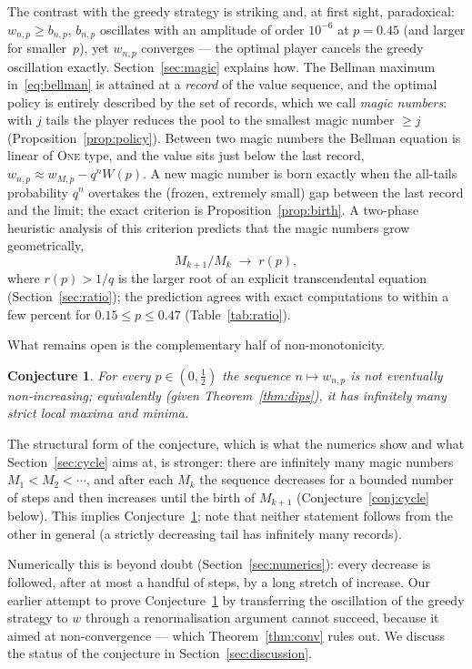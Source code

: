 \documentclass[11pt]{article}
\newtheorem{conjecture}[theorem]{Conjecture}
\theoremstyle{definition}
\newcommand{\One}{\textsc{One}}
\begin{document}
The contrast with the greedy strategy is striking and, at first
sight, paradoxical: $w_{n,p}\ge b_{n,p}$, $b_{n,p}$ oscillates with an
amplitude of order $10^{-6}$ at $p=0.45$ (and larger for smaller~$p$),
yet $w_{n,p}$ converges --- the optimal player cancels the greedy
oscillation exactly.  Section~\ref{sec:magic} explains how.  The
Bellman maximum in~\eqref{eq:bellman} is attained at a \emph{record}
of the value sequence, and the optimal policy is entirely described by
the set of records, which we call \emph{magic numbers}: with $j$ tails
the player reduces the pool to the smallest magic number $\ge j$
(Proposition~\ref{prop:policy}).  Between two magic numbers the
Bellman equation is linear of \One{} type, and the value sits just
below the last record, $w_{n,p}\approx w_{M,p}-q^{n}W(p)$.  A new
magic number is born exactly when the all-tails probability $q^{n}$
overtakes the (frozen, extremely small) gap between the last record
and the limit; the exact criterion is Proposition~\ref{prop:birth}.
A two-phase heuristic analysis of this criterion predicts that the
magic numbers grow geometrically,
\[
  M_{k+1}/M_k\;\longrightarrow\;r(p),
\]
where $r(p)>1/q$ is the larger root of an explicit transcendental
equation (Section~\ref{sec:ratio}); the prediction agrees with exact
computations to within a few percent for $0.15\le p\le0.47$
(Table~\ref{tab:ratio}).

What remains open is the complementary half of non-monotonicity.

\begin{conjecture}\label{conj:B}
  For every $p\in(0,\tfrac12)$ the sequence $n\mapsto w_{n,p}$ is not
  eventually non-increasing; equivalently (given
  Theorem~\ref{thm:dips}), it has infinitely many strict local maxima
  and minima.
\end{conjecture}

The structural form of the conjecture, which is what the numerics show
and what Section~\ref{sec:cycle} aims at, is stronger: there are
infinitely many magic numbers $M_1<M_2<\cdots$, and after each $M_k$
the sequence decreases for a bounded number of steps and then
increases until the birth of $M_{k+1}$ (Conjecture~\ref{conj:cycle}
below).  This implies Conjecture~\ref{conj:B}; note that neither
statement follows from the other in general (a strictly decreasing
tail has infinitely many records).

Numerically this is beyond doubt (Section~\ref{sec:numerics}): every
decrease is followed, after at most a handful of steps, by a long
stretch of increase.  Our earlier attempt to prove
Conjecture~\ref{conj:B} by transferring the oscillation of the greedy
strategy to $w$ through a renormalisation argument cannot succeed,
because it aimed at non-convergence --- which
Theorem~\ref{thm:conv} rules out.  We discuss the status of the
conjecture in Section~\ref{sec:discussion}.
\end{document}
